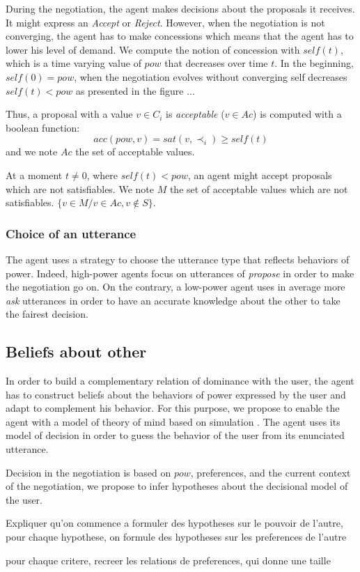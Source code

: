 \documentclass{llncs}
\begin{document}
	 During the negotiation, the agent makes decisions about the proposals it receives. It might express an \emph{Accept} or \emph{Reject}. However, when the negotiation is not converging, the agent has to make concessions which means that the agent has to lower his level of demand. 
	 We compute the notion of concession with $self(t)$, which is a time varying value of $pow$ that decreases over time $t$. In the beginning, $self(0) = pow$, when the negotiation evolves without converging self decreases $self(t) < pow$ as presented in the figure ... 
	 
	Thus, a proposal with a value $v \in C_i$ is \emph{acceptable} ($v \in Ac$) is computed with a boolean function:
			\begin{equation}
				acc(pow, v) = sat(v, \prec_i) \geq self(t)
			\end{equation}	
	and we note $Ac$ the set of acceptable values.

	At a moment $t \not = 0$, where $self(t) < pow$,  an agent might accept proposals which are not satisfiables.  We note $M$ the set of acceptable values which are not satisfiables.
	$\{v \in M / v \in Ac, v \notin S\}$.
	
%	
\subsubsection{Choice of an utterance}
	The agent uses a strategy to choose the utterance type that reflects behaviors of power. Indeed, high-power agents focus on utterances of \emph{propose} in order to make the negotiation go on. On the contrary, a low-power agent uses in average more \emph{ask} utterances in order to have an accurate knowledge about the other to take the fairest decision.
	
	\subsection{Beliefs about other}
	
	In order to build a complementary relation of dominance with the user, the agent has to construct beliefs about the behaviors of power expressed by the user and adapt to complement his behavior. 
	For this purpose, we propose to enable the agent with a model of theory of mind  based on simulation \cite{bibid}. The agent uses its model of decision in order to guess the behavior of the user from its enunciated utterance.   
	
	Decision in the negotiation is based on $pow$, preferences, and the current context of the negotiation, we propose to infer hypotheses about the decisional model of the user. 
	
	Expliquer qu'on commence a formuler des hypotheses sur le pouvoir de l'autre, pour chaque hypothese, on formule des hypotheses sur les preferences de l'autre 
	
	pour chaque critere, recreer les relations de preferences, qui donne une taille
	
	
\end{document}
